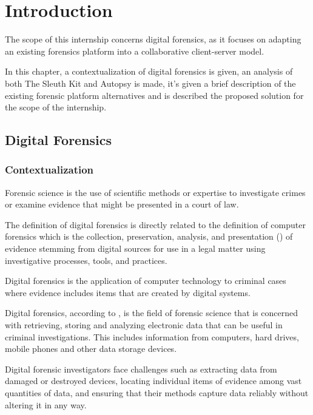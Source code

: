 
\chapter{Introduction}
\label{ch:introduction}

The scope of this internship concerns digital forensics, as it focuses on adapting an existing forensics platform into a collaborative client-server model.

In this chapter, a contextualization of digital forensics is given, an analysis of both The Sleuth Kit and Autopsy is made, it's given a brief description of
the existing forensic platform alternatives and is described the proposed solution for the scope of the internship.

\section{Digital Forensics}

\subsection{Contextualization}

Forensic science is the use of scientific methods or expertise to investigate crimes
or examine evidence that might be presented in a court of law.

The definition of digital forensics is directly related to the definition of
computer forensics which is the collection, preservation, analysis,
and presentation () of evidence stemming from digital sources for use in a legal matter
using investigative processes, tools, and practices.

Digital forensics is the application of computer technology to criminal cases where evidence
includes items that are created by digital systems.

Digital forensics, according to \citeauthor{nist}, is the field of forensic science that is concerned with retrieving,
storing and analyzing electronic data that can be useful in criminal investigations.
This includes information from computers, hard drives, mobile phones and other data
storage devices.

Digital forensic investigators face challenges such as extracting data from damaged or destroyed
devices, locating individual items of evidence among vast quantities of data,
and ensuring that their methods capture data reliably without altering it in any way.

